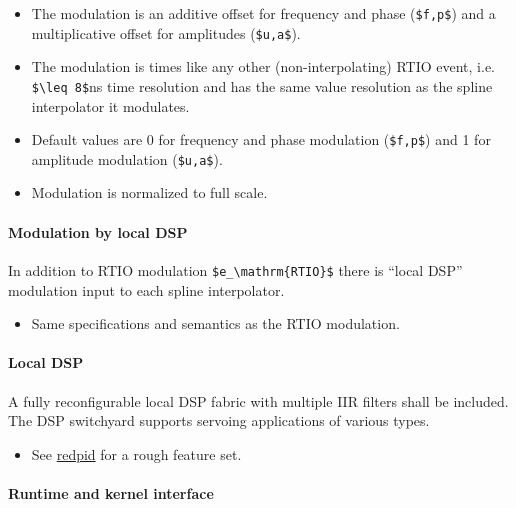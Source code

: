 \begin{itemize}
	\item
	The modulation is an additive offset for frequency and phase
	(\texttt{\$f,p\$}) and a multiplicative offset for amplitudes
	(\texttt{\$u,a\$}).
	\item
	The modulation is times like any other (non-interpolating) RTIO event,
	i.e. \texttt{\$\textbackslash{}leq\ 8\$}ns time resolution and has the
	same value resolution as the spline interpolator it modulates.
	\item
	Default values are 0 for frequency and phase modulation
	(\texttt{\$f,p\$}) and 1 for amplitude modulation (\texttt{\$u,a\$}).
	\item
	Modulation is normalized to full scale.
\end{itemize}

\paragraph{Modulation by local DSP}\label{modulation-by-local-dsp}

In addition to RTIO modulation
\texttt{\$e\_\textbackslash{}mathrm\{RTIO\}\$} there is ``local DSP''
modulation input to each spline interpolator.

\begin{itemize}

	\item
	Same specifications and semantics as the RTIO modulation.
\end{itemize}

\paragraph{Local DSP}\label{local-dsp}

A fully reconfigurable local DSP fabric with multiple IIR filters shall
be included. The DSP switchyard supports servoing applications of
various types.

\begin{itemize}

	\item
	See \href{https://github.com/jordens/redpid}{redpid} for a rough
	feature set.
\end{itemize}

\paragraph{Runtime and kernel
	interface}\label{runtime-and-kernel-interface}

